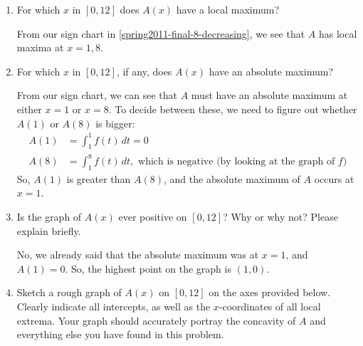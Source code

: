 \documentclass{article}
\begin{document}
\begin{enumerate}
{\begin{enumerate}
    \item For which $x$ in $[0, 12]$ does $A(x)$ have a local maximum?

      \pspace{\vfill}

      \begin{solution}
        From our sign chart in \ref{spring2011-final-8-decreasing}, we see
        that $A$ has local maxima at $x = 1, 8$.
      \end{solution}

    \item For which $x$ in $[0, 12]$, if any, does $A(x)$ have an
      absolute maximum? 

      \pspace{\vfill\newpage}

      \begin{solution}
        From our sign chart, we can see that $A$ must have an absolute
        maximum at either $x = 1$ or $x = 8$.  To decide between these, we
        need to figure out whether $A(1)$ or $A(8)$ is bigger:
        \begin{align*}
          A(1) &= \int_1^1 f(t)\,dt = 0 \\
          A(8) &= \int_1^8 f(t)\,dt, \text{ which is negative (by
            looking at the graph of $f$)}
        \end{align*}
        So, $A(1)$ is greater than $A(8)$, and the absolute
        maximum of $A$ occurs at $x = 1$.
      \end{solution}

    \item
      \begin{problem}[\vfill]
        Is the graph of $A(x)$ ever positive on $[0, 12]$? Why or why
        not? Please explain briefly.
      \end{problem}

      \begin{solution}
        No, we already said that the absolute maximum was at $x = 1$, and
        $A(1) = 0$.  So, the highest point on the graph is $(1, 0)$.
      \end{solution}    

    \item 

      \begin{problem}
        Sketch a rough graph of $A(x)$ on $[0, 12]$ on the axes
        provided below.  Clearly indicate all intercepts, as well as the
        $x$-coordinates of all local extrema.  Your graph should
        accurately portray the concavity of $A$ and everything else you
        have found in this problem.
      \end{problem}


\end{enumerate}}
\end{enumerate}
\end{document}
